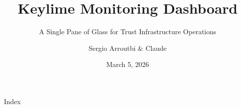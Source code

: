 \documentclass{beamer}
\title{Keylime Monitoring Dashboard}
\subtitle{A Single Pane of Glass for Trust Infrastructure Operations}
\author{Sergio Arroutbi \& Claude}
\institute[]{Security Special Projects}
\date{March 5, 2026}
\begin{document}
\begin{frame}
  \titlepage
\end{frame}

\begin{frame}{Index}
  \tiny
  \tableofcontents
\end{frame}


















\end{document}
